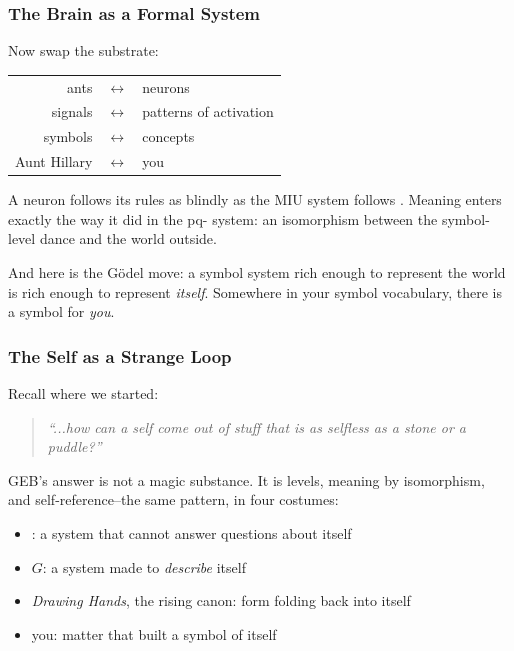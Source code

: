 \documentclass[aspectratio=169]{beamer}
\newcommand{\tm}[1]{\text{\color{textColor}\texttt{#1}}}
\newcommand{\rname}[1]{\text{\small\color{auxColor}\textsc{#1}}}
\begin{document}
\begin{frame}[fragile]
  \frametitle{The Brain as a Formal System}

  Now swap the substrate:

  \begin{center}
  \begin{tabular}{r c l}
    ants & $\longleftrightarrow$ & neurons \\
    signals & $\longleftrightarrow$ & patterns of activation \\
    symbols & $\longleftrightarrow$ & concepts \\
    Aunt Hillary & $\longleftrightarrow$ & you \\
  \end{tabular}
  \end{center}

  \pause
  \vspace{\fill}

  A neuron follows its rules as blindly as the MIU system follows
  \rname{II}. Meaning enters exactly the way it did in the pq-
  system: an isomorphism between the symbol-level dance and the world
  outside.

  \pause
  \vspace{\fill}

  And here is the G\"odel move: a symbol system rich enough to
  represent the world is rich enough to represent \textit{itself}.
  Somewhere in your symbol vocabulary, there is a symbol for
  \textit{you}.
\end{frame}

\begin{frame}[fragile]
  \frametitle{The Self as a Strange Loop}


  \pause
  \vspace{\fill}

  Recall where we started:

  \begin{quote}
    \textit{``...how can a self come out of stuff that is as selfless
    as a stone or a puddle?''}
  \end{quote}

  GEB's answer is not a magic substance. It is levels, meaning by
  isomorphism, and self-reference--the same pattern, in four costumes:

  \begin{itemize}
    \item \tm{MU}: a system that cannot answer questions about itself
    \item $G$: a system made to \textit{describe} itself
    \item \textit{Drawing Hands}, the rising canon: form folding back
      into itself
    \item you: matter that built a symbol of itself
  \end{itemize}
\end{frame}
\end{document}
